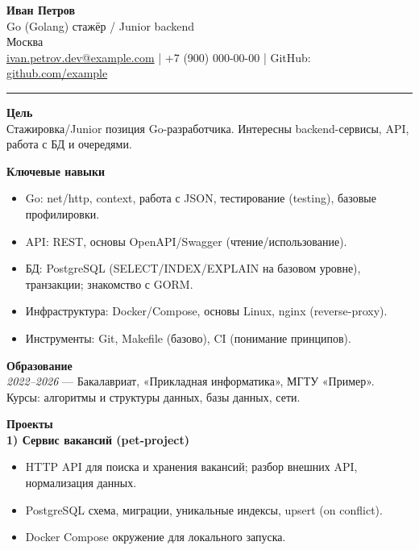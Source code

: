\documentclass[11pt,a4paper]{article}
\begin{document}
{\Large \textbf{Иван Петров}}\\
Go (Golang) стажёр / Junior backend\\
Москва\\
\href{mailto:ivan.petrov.dev@example.com}{ivan.petrov.dev@example.com} \;|\; +7 (900) 000-00-00 \;|\; GitHub: \href{https://github.com/example}{github.com/example}

\vspace{6pt}
\hrule
\vspace{8pt}

\textbf{Цель}\\
Стажировка/Junior позиция Go-разработчика. Интересны backend-сервисы, API, работа с БД и очередями.

\vspace{8pt}
\textbf{Ключевые навыки}\\
\begin{itemize}
  \item Go: net/http, context, работа с JSON, тестирование (testing), базовые профилировки.
  \item API: REST, основы OpenAPI/Swagger (чтение/использование).
  \item БД: PostgreSQL (SELECT/INDEX/EXPLAIN на базовом уровне), транзакции; знакомство с GORM.
  \item Инфраструктура: Docker/Compose, основы Linux, nginx (reverse-proxy).
  \item Инструменты: Git, Makefile (базово), CI (понимание принципов).
\end{itemize}

\vspace{6pt}
\textbf{Образование}\\
\textit{2022--2026} — Бакалавриат, «Прикладная информатика», МГТУ «Пример».\\
Курсы: алгоритмы и структуры данных, базы данных, сети.

\vspace{8pt}
\textbf{Проекты}\\
\textbf{1) Сервис вакансий (pet-project)}\\
\begin{itemize}
  \item HTTP API для поиска и хранения вакансий; разбор внешних API, нормализация данных.
  \item PostgreSQL схема, миграции, уникальные индексы, upsert (on conflict).
  \item Docker Compose окружение для локального запуска.
\end{itemize}
\end{document}
